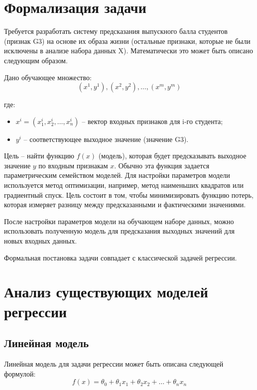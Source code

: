 \section{Формализация задачи}

Требуется разработать систему предсказания выпускного балла студентов (признак G3) на основе их образа жизни (остальные признаки, которые не были исключены в анализе набора данных X). Математически это может быть описано следующим образом.

Дано обучающее множество:
\begin{equation}
    {(x^{1}, y^{1}), (x^{2}, y^{2}), …, (x^{m}, y^{m})}
\end{equation}
    
где:
\begin{itemize}
    \item $x^{i} = (x_1^{i}, x_2^{i}, …, x_n^{i})$ -- вектор входных признаков для i-го студента;
    \item $y^{i}$ -- соответствующее выходное значение (значение G3).
\end{itemize}

Цель -- найти функцию $f(x)$ (модель), которая будет предсказывать выходное значение $y$ по входным признакам $x$. Обычно эта функция задается параметрическим семейством моделей. Для настройки параметров модели используется метод оптимизации, например, метод наименьших квадратов или градиентный спуск. Цель состоит в том, чтобы минимизировать функцию потерь, которая измеряет разницу между предсказанными и фактическими значениями.

После настройки параметров модели на обучающем наборе данных, можно использовать полученную модель для предсказания выходных значений для новых входных данных.

Формальная постановка задачи совпадает с классической задачей регрессии.

\section{Анализ существующих моделей регрессии}

\subsection{Линейная модель}
Линейная модель для задачи регрессии может быть описана следующей формулой:
\begin{equation}
     f(x) = θ_0 + θ_1 x_1 + θ_2 x_2 + … + θ_n x_n
\end{equation}

